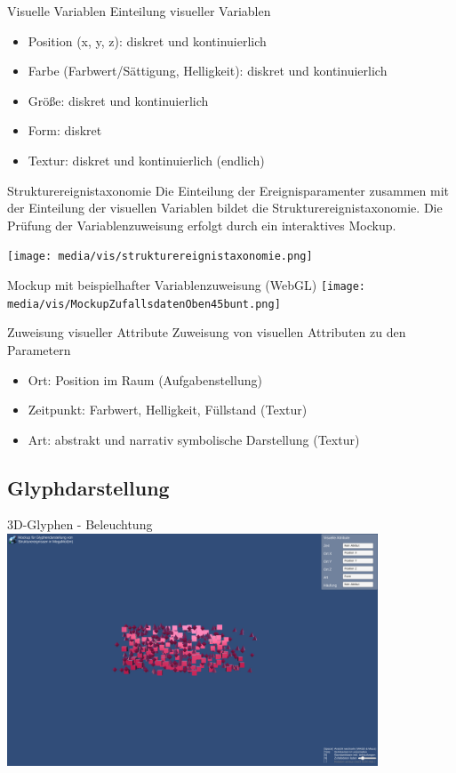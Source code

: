 \documentclass[10pt]{beamer}
\begin{document}
\begin{frame}{Visuelle Variablen}
	Einteilung visueller Variablen
	\begin{itemize}
		\item Position (x, y, z): diskret und kontinuierlich
		\item Farbe (Farbwert/Sättigung, Helligkeit): diskret und kontinuierlich
		\item Größe: diskret und kontinuierlich
		\item Form: diskret
		\item Textur: diskret und kontinuierlich (endlich)
	\end{itemize}
\end{frame}

\begin{frame}{Strukturereignistaxonomie}
	Die Einteilung der Ereignisparamenter zusammen mit der Einteilung der visuellen Variablen bildet die Strukturereignistaxonomie. Die Prüfung der Variablenzuweisung erfolgt durch ein interaktives Mockup.

	\texttt{[image: media/vis/strukturereignistaxonomie.png]}
\end{frame}

\begin{frame}{Mockup mit beispielhafter Variablenzuweisung (WebGL)}
	\texttt{[image: media/vis/MockupZufallsdatenOben45bunt.png]}
\end{frame}

\begin{frame}{Zuweisung visueller Attribute}
	Zuweisung von visuellen Attributen zu den Parametern
	\begin{itemize}
		\item Ort: Position im Raum (Aufgabenstellung)
		\item Zeitpunkt: Farbwert, Helligkeit, Füllstand (Textur)
		\item Art: abstrakt und narrativ symbolische Darstellung (Textur)
	\end{itemize}
\end{frame}

\subsection{Glyphdarstellung} %

\begin{frame}{3D-Glyphen - Beleuchtung}
	\includegraphics*[height=6.9cm]{media/vis/Mockup-Zufallsdaten-persp-ArtForm-vornEntfernter.png}
\end{frame}
\end{document}
